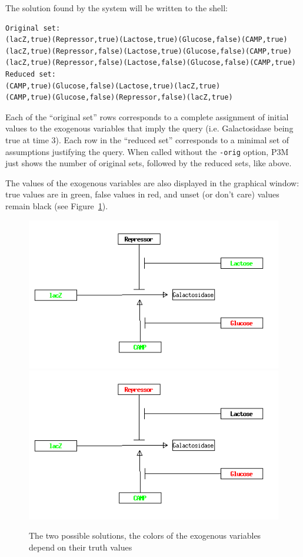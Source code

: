 \documentclass[a4paper]{article}
\renewcommand{\red}[1]{#1}
\begin{document}
The solution found by the system will be written to the shell:
\begin{verbatim}
Original set:
(lacZ,true)(Repressor,true)(Lactose,true)(Glucose,false)(CAMP,true)
(lacZ,true)(Repressor,false)(Lactose,true)(Glucose,false)(CAMP,true)
(lacZ,true)(Repressor,false)(Lactose,false)(Glucose,false)(CAMP,true)
Reduced set:
(CAMP,true)(Glucose,false)(Lactose,true)(lacZ,true)
(CAMP,true)(Glucose,false)(Repressor,false)(lacZ,true)
\end{verbatim}
Each of the ``original set'' rows corresponds to a complete assignment
of initial values to the exogenous variables that imply the query
(i.e. Galactosidase being true at time 3). Each row in the ``reduced set''
corresponds to a minimal set of assumptions  justifying the query.
\red{When called without the {\tt -orig} option, P3M just shows the
  number of original sets, followed by the reduced sets, like above.}

The values of the exogenous variables are also displayed in the
graphical window: true values are in green, false values in red, and
unset (or don't care) values remain black (see
Figure~\ref{fig:lac4}). 

\begin{figure}[h]
\begin{center}
  \includegraphics[scale=0.3]{lac_m0002.png}
  \includegraphics[scale=0.3]{lac_m0003.png}
\end{center}
\caption{The two possible solutions, the colors of the exogenous
  variables depend on their truth values} 
\label{fig:lac4}
\end{figure}
\end{document}
